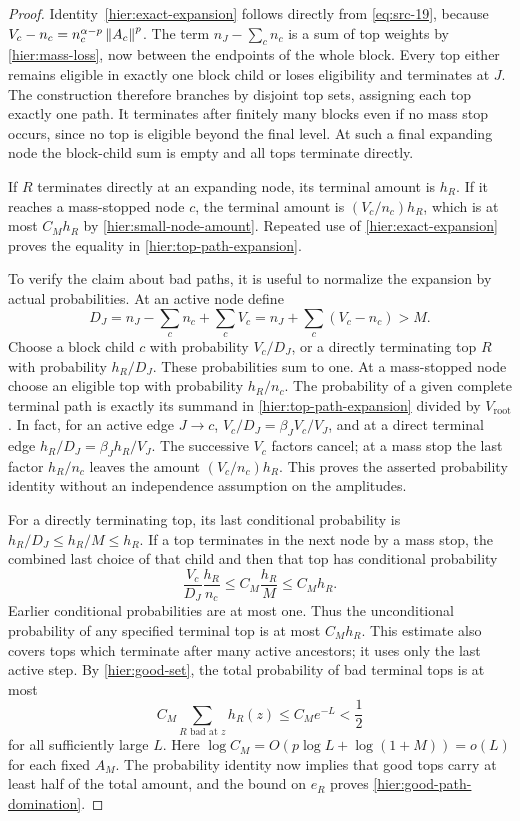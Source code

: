\begin{proof}
Identity~\eqref{hier:exact-expansion} follows directly from
\eqref{eq:src-19}, because
$V_c-n_c=n_c^{\alpha-p}\left\|A_c\right\|^p$.  The term
$n_J-\sum_c n_c$ is a sum of top weights by
\eqref{hier:mass-loss}, now between the endpoints of the whole block.
Every top either remains eligible in exactly one block child or loses
eligibility and terminates at $J$.  The construction therefore branches by disjoint
top sets, assigning each top exactly one path.  It terminates after
finitely many blocks even if no mass stop occurs, since no top is
eligible beyond the final level.  At such a final expanding node the
block-child sum is empty and all tops terminate directly.

If $R$ terminates directly at an expanding node, its terminal amount is
$h_R$.  If it reaches a mass-stopped node $c$, the terminal amount is
$(V_c/n_c)h_R$, which is at most $C_Mh_R$ by
\eqref{hier:small-node-amount}.  Repeated use of
\eqref{hier:exact-expansion} proves the equality in
\eqref{hier:top-path-expansion}.

To verify the claim about bad paths, it is useful to normalize the
expansion by actual probabilities.  At an active node define
\[
 D_J=n_J-\sum_c n_c+\sum_cV_c
     =n_J+\sum_c(V_c-n_c)>M.
\]
Choose a block child $c$ with probability $V_c/D_J$, or a directly
terminating top $R$ with probability $h_R/D_J$.  These probabilities sum
to one.  At a mass-stopped node choose an eligible top with probability
$h_R/n_c$.  The probability of a given complete terminal path is exactly
its summand in \eqref{hier:top-path-expansion} divided by
$V_{\mathrm{root}}$.  In fact, for an active edge $J\to c$,
$V_c/D_J=\beta_JV_c/V_J$, and at a direct terminal edge
$h_R/D_J=\beta_Jh_R/V_J$.  The successive $V_c$ factors cancel;
at a mass stop the last factor $h_R/n_c$ leaves the amount
$(V_c/n_c)h_R$.  This proves the asserted probability identity without
an independence assumption on the amplitudes.

For a directly terminating top, its last conditional probability is
$h_R/D_J\le h_R/M\le h_R$.  If a top terminates in the next node by a
mass stop, the combined last choice of that child and then that top has
conditional probability
\[
 \frac{V_c}{D_J}\frac{h_R}{n_c}
 \le C_M\frac{h_R}{M}\le C_Mh_R.
\]
Earlier conditional probabilities are at most one.  Thus the
unconditional probability of any specified terminal top is at most
$C_Mh_R$.  This estimate also covers tops which terminate after many
active ancestors; it uses only the last active step.  By
\eqref{hier:good-set}, the total probability of bad terminal tops is
at most
\[
 C_M\sum_{R\text{ bad at }z}h_R(z)\le C_Me^{-L}<\frac12
\]
for all sufficiently large $L$.  Here
$\log C_M=O(p\log L+\log(1+M))=o(L)$ for each fixed $A_M$.
The probability identity now implies that good tops carry at least half
of the total amount, and the bound on $e_R$ proves
\eqref{hier:good-path-domination}.
\end{proof}

